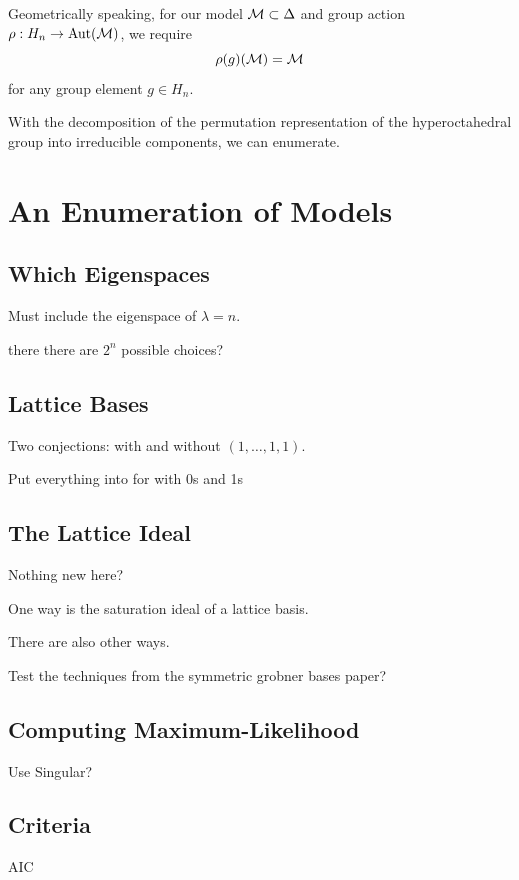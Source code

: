 \documentclass[cclicense]{hmcthesis}
\numberwithin{equation}{chapter}
\numberwithin{thmcounter}{chapter}
\begin{document}
    Geometrically speaking, for our model $\mathcal{M} \subset \Delta$ and group
    action $\rho: H_n \to \mathrm{Aut}(\mathcal{M})$, we require
    \[
        \rho(g)(\mathcal{M}) = \mathcal{M}
    \]
    for any group element $g \in H_n$.

    With the decomposition of the permutation representation of the
    hyperoctahedral group into irreducible components, we can enumerate.

\chapter{An Enumeration of Models}

\section{Which Eigenspaces}

    Must include the eigenspace of $\lambda = n$.

    there there are $2^n$ possible choices?

\section{Lattice Bases}
    
    Two conjections: with and without $(1, \ldots, 1, 1)$.

    Put everything into for with 0s and 1s

\section{The Lattice Ideal}

    Nothing new here?

    One way is the saturation ideal of a lattice basis.

    There are also other ways.

    Test the techniques from the symmetric grobner bases paper?

\section{Computing Maximum-Likelihood}

    Use Singular?

\section{Criteria}

    AIC
    
\end{document}
